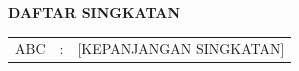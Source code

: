\clearpage
{}
{}
\begin{center}\large\textbf{DAFTAR SINGKATAN}\end{center}
\vspace{3em}
\begin{center}
\begin{tabular}{lll}
ABC & : & [KEPANJANGAN SINGKATAN] \\
\end{tabular}
\end{center}

